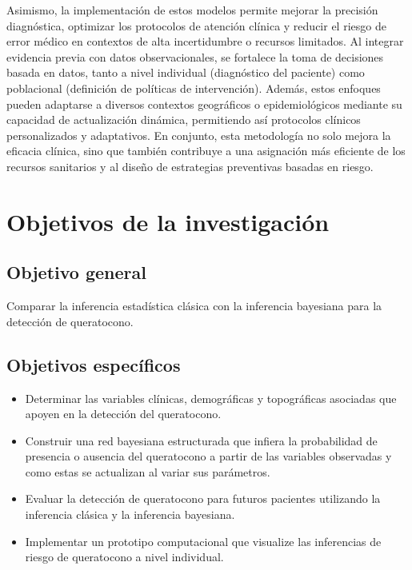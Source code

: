 Asimismo, la implementación de estos modelos permite mejorar la precisión diagnóstica, optimizar los protocolos de atención clínica y reducir el riesgo de error médico en contextos de alta incertidumbre o recursos limitados. Al integrar evidencia previa con datos observacionales, se fortalece la toma de decisiones basada en datos, tanto a nivel individual (diagnóstico del paciente) como poblacional (definición de políticas de intervención). Además, estos enfoques pueden adaptarse a diversos contextos geográficos o epidemiológicos mediante su capacidad de actualización dinámica, permitiendo así protocolos clínicos personalizados y adaptativos. En conjunto, esta metodología no solo mejora la eficacia clínica, sino que también contribuye a una asignación más eficiente de los recursos sanitarios y al diseño de estrategias preventivas basadas en riesgo.

\section{Objetivos de la investigación}
\subsection{Objetivo general}
Comparar la inferencia estadística clásica con la inferencia bayesiana para la detección de queratocono.
\subsection{Objetivos específicos}
\begin{itemize}
	\item Determinar las variables clínicas, demográficas y topográficas asociadas que apoyen en la detección del queratocono.
	\item Construir una red bayesiana estructurada que infiera la probabilidad de presencia o ausencia del queratocono a partir de las variables observadas y como estas se actualizan al variar sus parámetros.
	\item Evaluar la detección de queratocono para futuros pacientes utilizando la inferencia clásica y la inferencia bayesiana.
	\item Implementar un prototipo computacional que visualize las inferencias de riesgo de queratocono a nivel individual.
\end{itemize}
